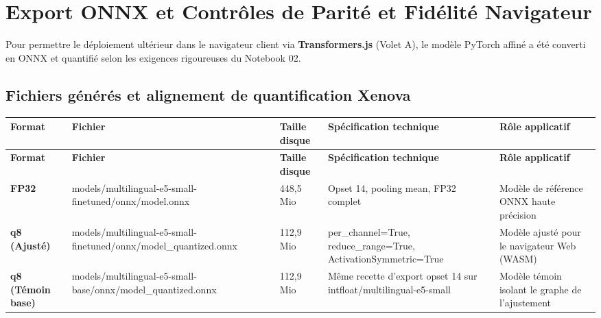 \documentclass[11pt,a4paper]{article}
\newcommand{\code}[1]  {{\ttfamily #1}}
\newcommand{\thead}[1]{{\tabfont\bfseries\color{accent}\hspace{0pt}#1}}
\newenvironment{tabletype}
  {\par\addvspace{7pt}\begingroup
   \tabfont\setlength{\tabcolsep}{4pt}\renewcommand{\arraystretch}{1.26}
   \setlength{\LTleft}{0pt}\setlength{\LTright}{0pt}
   \setlength{\extrarowheight}{1pt}
   \hyphenpenalty=9000\exhyphenpenalty=9000
   \emergencystretch=0pt\hbadness=10000\relax}
  {\endgroup\par\addvspace{9pt}}
\newlength{\tw}\setlength{\tw}{\textwidth}
\newcommand{\settw}[1]{\setlength{\tw}{\dimexpr\textwidth-#1pt\relax}}
\begin{document}
\section{Export ONNX et Contrôles de Parité et Fidélité Navigateur}

Pour permettre le déploiement ultérieur dans le navigateur client via \textbf{Transformers.js} (Volet A), le modèle PyTorch affiné a été converti en ONNX et quantifié selon les exigences rigoureuses du Notebook 02.

\subsection{Fichiers générés et alignement de quantification Xenova}
\begin{tabletype}
\footnotesize
\settw{32.0}
\setlength{\LTpre}{0pt}\setlength{\LTpost}{0pt}
\begin{longtable}{@{}L{0.07776\tw}L{0.31012\tw}L{0.06503\tw}L{0.31395\tw}L{0.23314\tw}@{}}
\toprule
\thead{Format} & \thead{Fichier} & \thead{Taille disque} & \thead{Spécification technique} & \thead{Rôle applicatif} \\
\midrule
\endfirsthead
\toprule
\thead{Format} & \thead{Fichier} & \thead{Taille disque} & \thead{Spécification technique} & \thead{Rôle applicatif} \\
\midrule
\endhead
\bottomrule
\endfoot
\bottomrule
\endlastfoot
\textbf{FP32} & \code{models/\allowbreak{}multilingual-\allowbreak{}e5-\allowbreak{}small-\allowbreak{}finetuned/\allowbreak{}onnx/\allowbreak{}model.\allowbreak{}onnx} & 448,5 Mio & Opset 14, pooling mean, FP32 complet & Modèle de référence ONNX haute précision \\
\textbf{q8 (Ajusté)} & \code{models/\allowbreak{}multilingual-\allowbreak{}e5-\allowbreak{}small-\allowbreak{}finetuned/\allowbreak{}onnx/\allowbreak{}model\_\allowbreak{}quantized.\allowbreak{}onnx} & 112,9 Mio & \code{per\_\allowbreak{}channel=True}, \code{reduce\_\allowbreak{}range=True}, \code{ActivationSymmetric=True} & Modèle ajusté pour le navigateur Web (WASM) \\
\textbf{q8 (Témoin base)} & \code{models/\allowbreak{}multilingual-\allowbreak{}e5-\allowbreak{}small-\allowbreak{}base/\allowbreak{}onnx/\allowbreak{}model\_\allowbreak{}quantized.\allowbreak{}onnx} & 112,9 Mio & Même recette d'export opset 14 sur \code{intfloat/\allowbreak{}multilingual-\allowbreak{}e5-\allowbreak{}small} & Modèle témoin isolant le graphe de l'ajustement \\
\end{longtable}
\end{tabletype}
\end{document}
